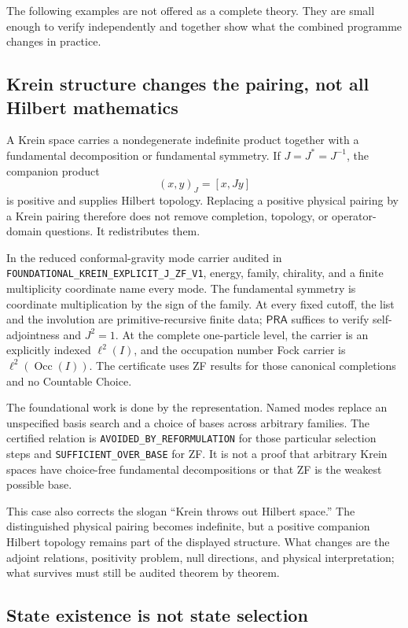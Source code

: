 \documentclass[11pt]{article}
\theoremstyle{definition}
\theoremstyle{remark}
\newcommand{\PRA}{\mathsf{PRA}}
\newcommand{\cert}[1]{\nolinkurl{#1}}
\newcommand{\rtype}[1]{\nolinkurl{#1}}
\begin{document}
The following examples are not offered as a complete theory.  They are small
enough to verify independently and together show what the combined programme
changes in practice.

\subsection{Krein structure changes the pairing, not all Hilbert mathematics}

A Krein space carries a nondegenerate indefinite product together with a
fundamental decomposition or fundamental symmetry.  If \(J=J^*=J^{-1}\), the
companion product
\[
              (x,y)_J=[x,Jy]
\]
is positive and supplies Hilbert topology.  Replacing a positive physical
pairing by a Krein pairing therefore does not remove completion, topology, or
operator-domain questions.  It redistributes them.

In the reduced conformal-gravity mode carrier audited in
\cert{FOUNDATIONAL_KREIN_EXPLICIT_J_ZF_V1}, energy, family, chirality, and a
finite multiplicity coordinate name every mode.  The fundamental symmetry is
coordinate multiplication by the sign of the family.  At every fixed cutoff,
the list and the involution are primitive-recursive finite data; \(\PRA\)
suffices to verify self-adjointness and \(J^2=1\).  At the complete one-particle
level, the carrier is an explicitly indexed \(\ell^2(I)\), and the occupation
number Fock carrier is \(\ell^2(\operatorname{Occ}(I))\).  The certificate uses
ZF results for those canonical completions and no Countable Choice.

The foundational work is done by the representation.  Named modes replace an
unspecified basis search and a choice of bases across arbitrary families.  The
certified relation is \rtype{AVOIDED_BY_REFORMULATION} for those particular
selection steps and \rtype{SUFFICIENT_OVER_BASE} for ZF.  It is not a proof
that arbitrary Krein spaces have choice-free fundamental decompositions or
that ZF is the weakest possible base.

This case also corrects the slogan ``Krein throws out Hilbert space.''  The
distinguished physical pairing becomes indefinite, but a positive companion
Hilbert topology remains part of the displayed structure.  What changes are
the adjoint relations, positivity problem, null directions, and physical
interpretation; what survives must still be audited theorem by theorem.

\subsection{State existence is not state selection}
\end{document}

